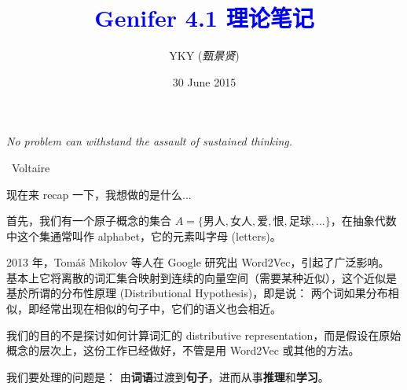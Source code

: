 \documentclass[12pt]{article}
\title{\textcolor{blue}{Genifer 4.1 理论笔记}}
\author{YKY (\textit{甄景贤})}
\date{30 June 2015}
\newcommand{\tab}{\hspace*{1cm}}
\begin{document}
\tab\tab\tab \parbox{9cm}{\textit{No problem can withstand the assault of sustained thinking.}}
\begin{flushright}
\textemdash\, Voltaire \hspace*{2cm}
\end{flushright}

\sffamily

{\let\newpage\relax\maketitle}

\maketitle
\setlength{\parindent}{0em}
\setlength{\parskip}{1.5ex plus0.5ex minus1.2ex}

现在来 recap 一下，我想做的是什么...

首先，我们有一个原子概念的集合 $A = \{ \mbox{男人}, \mbox{女人}, \mbox{爱}, \mbox{恨}, \mbox{足球},... \}$，在抽象代数中这个集通常叫作 alphabet，它的元素叫字母 (letters)。 

2013 年，Tom\'{a}\v{s} Mikolov 等人在 Google 研究出 Word2Vec，引起了广泛影响。  基本上它将离散的词汇集合映射到连续的向量空间（需要某种近似），这个近似是基於所谓的分布性原理 (Distributional Hypothesis)，即是说： 两个词如果分布相似，即经常出现在相似的句子中，它们的语义也会相近。 

我们的目的不是探讨如何计算词汇的 distributive representation，而是假设在原始概念的层次上，这份工作已经做好，不管是用 Word2Vec 或其他的方法。  


我们要处理的问题是： 由\textbf{词语}过渡到\textbf{句子}，进而从事\textbf{推理}和\textbf{学习}。
\end{document}
